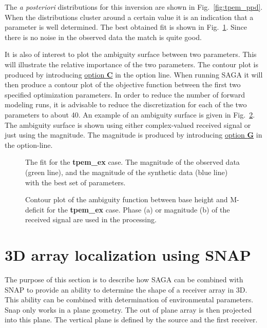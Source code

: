 \documentclass{saclantc}
\begin{document}
The {\it a posteriori} distributions for this inversion are shown in Fig.\
\ref{fig:tpem_ppd}. When the distributions cluster around a
certain value it is an indication that a parameter is well determined.
%
The best obtained fit is shown in Fig.\ \ref{fig:tpem_fit}.
Since there is no noise in the observed data  the match is quite good.
 
It is also of interest to plot the ambiguity surface between two
parameters. This will illustrate the relative importance of the two
parameters. The contour plot is produced by introducing
\underline{option {\bf C}} in the option line.
When running {\sf SAGA} it will then produce a contour plot of the
objective function between the first two specified optimization
parameters. In order to reduce the number of forward modeling
runs, it is advisable to reduce the discretization for each of the
two parameters to about 40. An example of an ambiguity surface is given in 
Fig.\ \ref{fig:tpem_con}. The ambiguity surface is shown using either
complex-valued received signal or just using the magnitude.  The
magnitude is produced by introducing  \underline{option {\bf G}}
in the option-line.



\begin{figure}
\epsfxsize=12cm
\centerline{}
\caption{The fit for the {\bf tpem{\_}ex} case. The  magnitude of the observed data
(green line), and the magnitude of the synthetic 
data (blue line) with  the best set of parameters. } 
\label{fig:tpem_fit}
\end{figure}

\begin{figure}
\epsfxsize=9cm
\centerline{}
\caption{Contour plot of the ambiguity function between base height
and M-deficit for the {\bf tpem\_ex} case. Phase (a)  or magnitude (b)
of the received signal are used in the processing.}
\label{fig:tpem_con}
\end{figure}

\section{ 3D array localization using SNAP}
\label{se:snap3d}
The purpose of this section is to describe how {\sf SAGA} can be
combined with {\sf SNAP} to provide an ability to determine  the shape
of a receiver array in 3D. This ability can be combined with
determination of environmental parameters.
Snap only works in a plane geometry. The out of plane array is then
projected into this plane. The vertical plane is defined by  the
source and the first receiver. 
\end{document}
